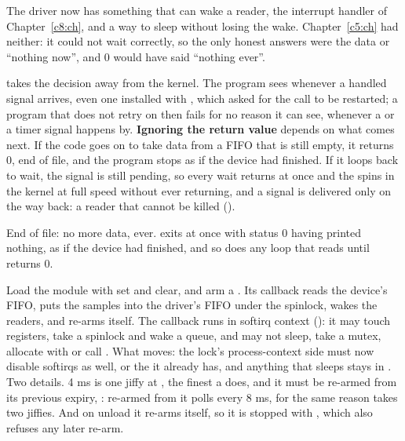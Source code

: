  The driver now has something that can wake a reader, the interrupt handler of
Chapter~\ref{c8:ch}, and a way to sleep without losing the wake. Chapter~\ref{c5:ch} had neither:
it could not wait correctly, so the only honest answers were the data or ``nothing now'', and 0
would have said ``nothing ever''.

 \textbf{} takes the decision away from the kernel. The program sees
 whenever a handled signal arrives, even one installed with , which
asked for the call to be restarted; a program that does not retry on  then fails for
no reason it can see, whenever a  or a timer signal happens by. \textbf{Ignoring the
return value} depends on what comes next. If the code goes on to take data from a FIFO that is
still empty, it returns 0, end of file, and the program stops as if the device had finished. If it
loops back to wait, the signal is still pending, so every wait returns at once and the
 spins in the kernel at full speed without ever returning, and a signal is delivered
only on the way back: a reader that cannot be killed ().

 End of file: no more data, ever.  exits at once with status 0
having printed nothing, as if the device had finished, and so does any loop that reads until
 returns 0.


 Load the module with  set and  clear, and arm a
. Its callback reads the device's FIFO, puts the samples into the driver's FIFO
under the spinlock, wakes the readers, and re-arms itself. The callback runs in softirq context
(): it may touch registers, take a spinlock and wake a queue, and may not sleep,
take a mutex, allocate with  or call . What moves: the lock's
process-context side must now disable softirqs as well,  or the 
it already has, and anything that sleeps stays in . Two details. 4 ms is one jiffy at
, the finest a  does, and it must be re-armed from its previous
expiry, : re-armed from  it polls every
8 ms, for the same reason  takes two jiffies. And on unload it re-arms itself, so
it is stopped with , which also refuses any later re-arm.

